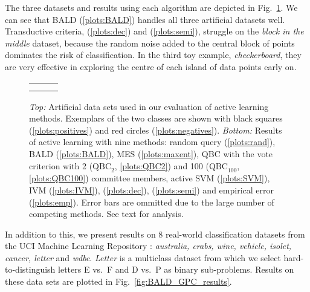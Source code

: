 The three datasets and results using each algorithm are depicted in Fig.\ \ref{fig:artificial}. We can see that BALD (\ref{plots:BALD}) handles all three artificial datasets well. Transductive criteria, \citet{Kapoor2007} (\ref{plots:dec}) and \citet{Zhu2003} (\ref{plots:semi}), struggle on the \emph{block in the middle} dataset, because the random noise added to the central block of points dominates the risk of classification. In the third toy example, \emph{checkerboard}, they are very effective in exploring the centre of each island of data points early on.

\begin{figure}
	\begin{center}
	\begin{tabular}{ccc}
	&
	&
	\\
	&
	&
	 \\
	\end{tabular}
	\end{center}
	\caption[Evaluation of Bayesian active learning on artificial data sets]{\emph{Top:} Artificial data sets used in our evaluation of active learning methods. Exemplars of the two classes are shown with black squares (\ref{plots:positives}) and red circles (\ref{plots:negatives}). \emph{Bottom:} Results of active learning with nine methods: random query (\ref{plots:rand}), BALD (\ref{plots:BALD}),  MES (\ref{plots:maxent}), QBC with the vote criterion with 2 ($\mbox{QBC}_2$, \ref{plots:QBC2}) and 100 ($\mbox{QBC}_{100}$, \ref{plots:QBC100}) committee members, active SVM (\ref{plots:SVM}), IVM (\ref{plots:IVM}), \citet{Kapoor2007} (\ref{plots:dec}), \citet{Zhu2003} (\ref{plots:semi}) and empirical error (\ref{plots:emp}). Error bars are ommitted due to the large number of competing methods. See text for analysis.}
	\label{fig:artificial}
\end{figure}

In addition to this, we present results on 8 real-world classification datasets from the UCI Machine Learning Repository \citep{UCIRepository}: \emph{australia, crabs, wine, vehicle, isolet, cancer, letter} and \emph{wdbc}. \emph{Letter} is a multiclass dataset from which we select hard-to-distinguish letters E vs.\ F and D vs.\ P as binary sub-problems. Results on these data sets are plotted in Fig.\ \ref{fig:BALD_GPC_results}.

